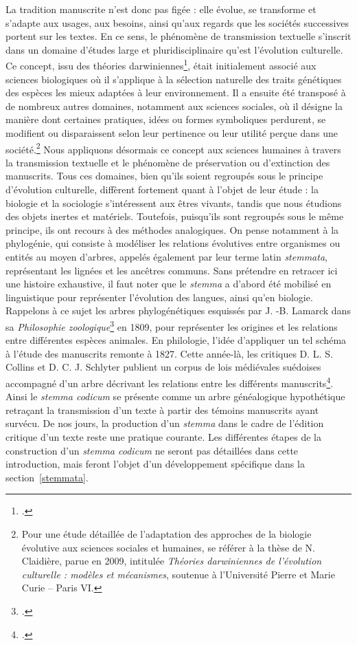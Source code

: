 \documentclass[a4paper,twoside,12pt]{book}
\begin{document}
La tradition manuscrite n’est donc pas figée : elle évolue, se transforme et s’adapte aux usages, aux besoins, ainsi qu’aux regards que les sociétés successives portent sur les textes. En ce sens, le phénomène de transmission textuelle s’inscrit dans un domaine d’études large et pluridisciplinaire qu’est l’évolution culturelle. Ce concept, issu des théories darwiniennes\footcite{Darwin1859}, était initialement associé aux sciences biologiques où il s’applique à la sélection naturelle des traits génétiques des espèces les mieux adaptées à leur environnement. Il a ensuite été transposé à de nombreux autres domaines, notamment aux sciences sociales, où il désigne la manière dont certaines pratiques, idées ou formes symboliques perdurent, se modifient ou disparaissent selon leur pertinence ou leur utilité perçue dans une société.\footnote{Pour une étude détaillée de l’adaptation des approches de la biologie évolutive aux sciences sociales et humaines, se référer à la thèse de N. Claidière, parue en 2009, intitulée \textit{Théories darwiniennes de l’évolution culturelle : modèles et mécanismes}, soutenue à l’Université Pierre et Marie Curie -- Paris VI.} Nous appliquons désormais ce concept aux sciences humaines à travers la transmission textuelle et le phénomène de préservation ou d’extinction des manuscrits.
Tous ces domaines, bien qu’ils soient regroupés sous le principe d’évolution culturelle, diffèrent fortement quant à l’objet de leur étude : la biologie et la sociologie s’intéressent aux êtres vivants, tandis que nous étudions des objets inertes et matériels. Toutefois, puisqu'ils sont regroupés sous le même principe, ils ont recours à des méthodes analogiques.
On pense notamment à la phylogénie, qui consiste à modéliser les relations évolutives entre organismes ou entités au moyen d’arbres, appelés également par leur terme latin \textit{stemmata}, représentant les lignées et les ancêtres communs. Sans prétendre en retracer ici une histoire exhaustive, il faut noter que le \textit{stemma} a d'abord été mobilisé en linguistique pour représenter l’évolution des langues, ainsi qu'en biologie. Rappelons à ce sujet les arbres phylogénétiques esquissés par J. -B. Lamarck dans sa \textit{Philosophie zoologique}\footcite{lamarck} en 1809, pour représenter les origines et les relations entre différentes espèces animales. En philologie, l'idée  d’appliquer un tel schéma à l’étude des manuscrits remonte à 1827. Cette année-là, les critiques D. L. S. Collins et D. C. J. Schlyter publient un corpus de lois médiévales suédoises accompagné d’un arbre décrivant les relations entre les différents manuscrits\footcite{collins}. Ainsi le \textit{stemma codicum} se présente comme un arbre généalogique hypothétique retraçant la transmission d’un texte à partir des témoins manuscrits ayant survécu. De nos jours, la production d’un \textit{stemma} dans le cadre de l’édition critique d’un texte reste une pratique courante. Les différentes étapes de la construction d’un \textit{stemma codicum} ne seront pas détaillées dans cette introduction, mais feront l’objet d’un développement spécifique dans la section~\ref{stemmata}.
\end{document}
